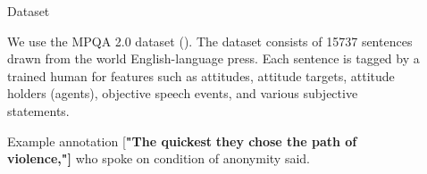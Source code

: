 \documentclass[final]{beamer}
\newlength{\sepwid}
\newlength{\onecolwid}
\newlength{\twocolwid}
\begin{document}
\begin{frame}[t]
\begin{columns}[t]
\begin{column}{\onecolwid}
\end{column} %

\begin{column}{\sepwid}\end{column} %

\begin{column}{\twocolwid} %



\begin{column}{\twocolwid}\vspace{-.6in} %


\begin{block}{Dataset}

We use the MPQA 2.0 dataset (\cite{wiebe2005annotating}). The dataset consists of 15737 sentences drawn from the world English-language press. Each sentence is tagged by a trained human for features such as attitudes, attitude targets, attitude holders (agents), objective speech events, and various subjective statements.

\begin{alertblock}{Example annotation}
[\textbf{"The quickest }  \textbf{they chose the path of violence,"]}  who spoke on condition of anonymity said.
\end{alertblock}

\end{block}


\end{column} %

\begin{column}{\twocolwid}\vspace{-.6in} %


\end{column}
\end{column}
\end{columns}
\end{frame}
\end{document}
